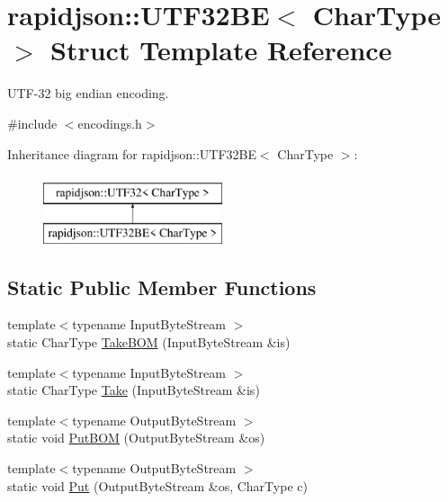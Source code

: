 \hypertarget{structrapidjson_1_1_u_t_f32_b_e}{}\section{rapidjson\+::U\+T\+F32\+BE$<$ Char\+Type $>$ Struct Template Reference}
\label{structrapidjson_1_1_u_t_f32_b_e}


U\+T\+F-\/32 big endian encoding.  




{\ttfamily \#include $<$encodings.\+h$>$}

Inheritance diagram for rapidjson\+::U\+T\+F32\+BE$<$ Char\+Type $>$\+:\begin{figure}[H]
\begin{center}
\leavevmode
\includegraphics[height=2.000000cm]{structrapidjson_1_1_u_t_f32_b_e}
\end{center}
\end{figure}
\subsection*{Static Public Member Functions}
\begin{DoxyCompactItemize}
\item 
{\footnotesize template$<$typename Input\+Byte\+Stream $>$ }\\static Char\+Type \mbox{\hyperlink{structrapidjson_1_1_u_t_f32_b_e_a36bca05acf96452fdebb12ba36b17c63}{Take\+B\+OM}} (Input\+Byte\+Stream \&is)
\item 
{\footnotesize template$<$typename Input\+Byte\+Stream $>$ }\\static Char\+Type \mbox{\hyperlink{structrapidjson_1_1_u_t_f32_b_e_af92223e22d792426cc2e296ffa8c2464}{Take}} (Input\+Byte\+Stream \&is)
\item 
{\footnotesize template$<$typename Output\+Byte\+Stream $>$ }\\static void \mbox{\hyperlink{structrapidjson_1_1_u_t_f32_b_e_a2b3bd7fde8445fa7cf4260a22a1886bd}{Put\+B\+OM}} (Output\+Byte\+Stream \&os)
\item 
{\footnotesize template$<$typename Output\+Byte\+Stream $>$ }\\static void \mbox{\hyperlink{structrapidjson_1_1_u_t_f32_b_e_ab9a9ff04ee3e835839fffd99037d4615}{Put}} (Output\+Byte\+Stream \&os, Char\+Type c)
\end{DoxyCompactItemize}
